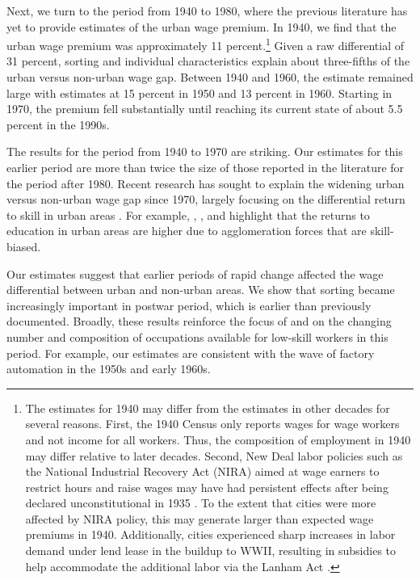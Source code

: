 \documentclass[12pt]{article}
\begin{document}
Next, we turn to the period from 1940 to 1980, where the previous literature has yet to provide estimates of the urban wage premium.
In 1940, we find that the urban wage premium was approximately 11 percent.\footnote{
The estimates for 1940 may differ from the estimates in other decades for several reasons. First, the 1940 Census only reports wages for wage workers and not income for all workers. Thus, the composition of employment in 1940 may differ relative to later decades. Second, New Deal labor policies such as the National Industrial Recovery Act (NIRA) aimed at wage earners to restrict hours and raise wages may have had persistent effects after being declared unconstitutional in 1935 \citep{cole2004new,fishback2024labor}. To the extent that cities were more affected by NIRA policy, this may generate larger than expected wage premiums in 1940. Additionally, cities experienced sharp increases in labor demand under lend lease in the buildup to WWII, resulting in subsidies to help accommodate the additional labor via the Lanham Act \citep{herbst2017universal, goldin2025mobilizing}. 
}
Given a raw differential of 31 percent, sorting and individual characteristics explain about three-fifths of the urban versus non-urban wage gap.
Between 1940 and 1960, the estimate remained large with estimates at 15 percent in 1950 and 13 percent in 1960. 
Starting in 1970, the premium fell substantially until reaching its current state of about 5.5 percent in the 1990s.

The results for the period from 1940 to 1970 are striking.
Our estimates for this earlier period are more than twice the size of those reported in the literature for the period after 1980.
Recent research has sought to explain the widening urban versus non-urban wage gap since 1970, largely focusing on the differential return to skill in urban areas \citep*{ganong2017has, baum2018has, dauth2022matching, autorWorkPastFuture}.
For example, \citet*{baum2018has}, \citet*{autorWorkPastFuture}, and \citet*{davis2020comparative} highlight that the returns to education in urban areas are higher due to agglomeration forces that are skill-biased. 

Our estimates suggest that earlier periods of rapid change affected the wage differential between urban and non-urban areas.
We show that sorting became increasingly important in postwar period, which is earlier than previously documented.
Broadly, these results reinforce the focus of \citet{autorWorkPastFuture} and \citet{papageorgiou2022occupational} on the changing number and composition of occupations available for low-skill workers in this period.
For example, our estimates are consistent with the wave of factory automation in the 1950s and early 1960s. 
\end{document}

